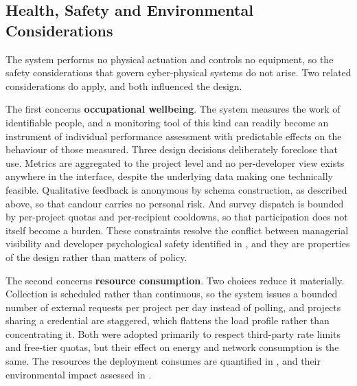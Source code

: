 \subsection{Health, Safety and Environmental Considerations}
\label{subsec:hse-design}

The system performs no physical actuation and controls no equipment, so the
safety considerations that govern cyber-physical systems do not arise. Two
related considerations do apply, and both influenced the design.

The first concerns \textbf{occupational wellbeing}. The system measures the work
of identifiable people, and a monitoring tool of this kind can readily become an
instrument of individual performance assessment with predictable effects on
the behaviour of those measured. Three design decisions deliberately foreclose
that use. Metrics are aggregated to the project level and no per-developer view
exists anywhere in the interface, despite the underlying data making one
technically feasible. Qualitative feedback is anonymous by schema construction,
as described above, so that candour carries no personal risk. And survey dispatch
is bounded by per-project quotas and per-recipient cooldowns, so that
participation does not itself become a burden. These constraints resolve the
conflict between managerial visibility and developer psychological safety
identified in , and they are properties of the design rather
than matters of policy.

The second concerns \textbf{resource consumption}. Two choices reduce it
materially. Collection is scheduled rather than continuous, so the system issues
a bounded number of external requests per project per day instead of polling,
and projects sharing a credential are staggered, which flattens the load profile
rather than concentrating it. Both were adopted primarily to respect third-party
rate limits and free-tier quotas, but their effect on energy and network
consumption is the same. The resources the deployment consumes are quantified in
, and their environmental impact assessed in
.



